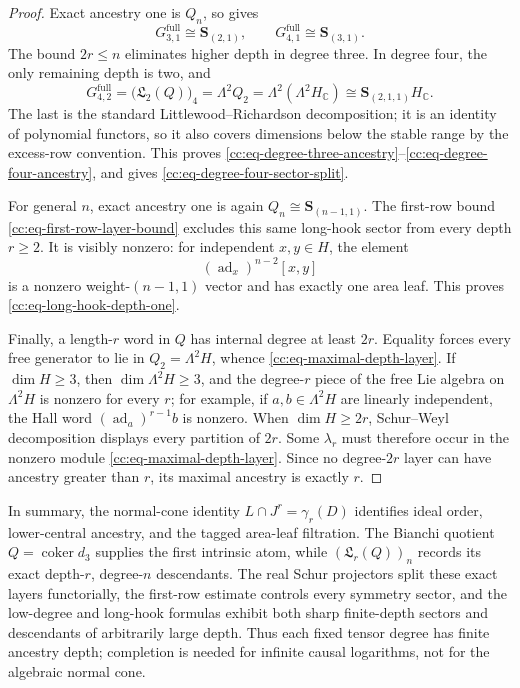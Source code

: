 \documentclass[10pt,reqno]{amsart}
\theoremstyle{plain}
\theoremstyle{definition}
\theoremstyle{remark}
\begin{document}
\begin{proof}
Exact ancestry one is \(Q_n\), so  gives
\[
 G^{\mathrm{full}}_{3,1}\cong\mathbf S_{(2,1)},\qquad
 G^{\mathrm{full}}_{4,1}\cong\mathbf S_{(3,1)}.
\]
The bound \(2r\leq n\) eliminates higher depth in degree three.  In
degree four, the only remaining depth is two, and
\[
 G^{\mathrm{full}}_{4,2}
 =\bigl({\mathfrak L}_2(Q)\bigr)_4
 =\Lambda^2Q_2
 =\Lambda^2(\Lambda^2H_{\mathbb C})
 \cong\mathbf S_{(2,1,1)}H_{\mathbb C}.
\]
The last is the standard Littlewood--Richardson decomposition; it is an
identity of polynomial functors, so it also covers dimensions below the
stable range by the excess-row convention.  This proves
\eqref{cc:eq-degree-three-ancestry}--\eqref{cc:eq-degree-four-ancestry},
and  gives
\eqref{cc:eq-degree-four-sector-split}.

For general \(n\), exact ancestry one is again
\(Q_n\cong\mathbf S_{(n-1,1)}\).  The first-row bound
\eqref{cc:eq-first-row-layer-bound} excludes this same long-hook sector
from every depth \(r\geq2\).  It is visibly nonzero: for independent
\(x,y\in H\), the element
\[
 (\operatorname{ad}_x)^{n-2}[x,y]
\]
is a nonzero weight-\((n-1,1)\) vector and has exactly one area leaf.
This proves
\eqref{cc:eq-long-hook-depth-one}.

Finally, a length-\(r\) word in \(Q\) has internal degree at least
\(2r\).  Equality forces every free generator to lie in
\(Q_2=\Lambda^2H\), whence
\eqref{cc:eq-maximal-depth-layer}.  If \(\dim H\geq3\), then
\(\dim\Lambda^2H\geq3\), and the degree-\(r\) piece of the free Lie
algebra on \(\Lambda^2H\) is nonzero for every \(r\); for example, if
\(a,b\in\Lambda^2H\) are linearly independent, the Hall word
\((\operatorname{ad}_a)^{r-1}b\) is nonzero.  When
\(\dim H\geq2r\), Schur--Weyl decomposition displays every partition of
\(2r\).  Some \(\lambda_r\) must therefore occur in the nonzero module
\eqref{cc:eq-maximal-depth-layer}.  Since no degree-\(2r\) layer can
have ancestry greater than \(r\), its maximal ancestry is exactly \(r\).
\end{proof}

In summary, the normal-cone identity
\(L\cap J^r=\gamma_r(D)\) identifies ideal order, lower-central
ancestry, and the tagged area-leaf filtration.  The Bianchi quotient
\(Q=\operatorname{coker}d_3\) supplies the first intrinsic atom, while
\((\mathfrak L_r(Q))_n\) records its exact depth-\(r\),
degree-\(n\) descendants.  The real Schur projectors split these exact
layers functorially, the first-row estimate controls every symmetry
sector, and the low-degree and long-hook formulas exhibit both sharp
finite-depth sectors and descendants of arbitrarily large depth.  Thus
each fixed tensor degree has finite ancestry depth; completion is needed
for infinite causal logarithms, not for the algebraic normal cone.
\end{document}
